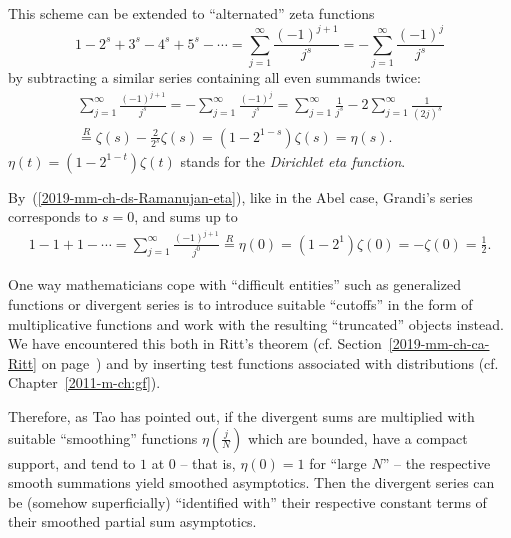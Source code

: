 This scheme can be extended\cite{Masina-Grandi} to ``alternated''
zeta functions
\begin{equation}
1-2^s+3^s-4^s+5^s - \cdots =\sum_{j=1}^\infty \frac{(-1)^{j+1}}{j^s}
=      - \sum_{j=1}^\infty \frac{(-1)^j}{j^s} %
\end{equation}
by subtracting a similar series containing all even summands
twice:
\begin{equation}
\begin{split}
\sum_{j=1}^\infty \frac{(-1)^{j+1}}{j^s}
=
-\sum_{j=1}^\infty \frac{(-1)^j}{j^s}
=
\sum_{j=1}^\infty \frac{ 1 }{j^s}
-
2 \sum_{j=1}^\infty \frac{ 1 }{ (2j)^s}
\\
\stackrel{R}{=}
\zeta (s) - \frac{2}{2^s}\zeta (s)
=
\left(1  -2^{1-s} \right)   \zeta (s)
=\eta (s).
\end{split}
\label{2019-mm-ch-ds-Ramanujan-eta}
\end{equation}
$\eta (t) = \left(1  -2^{1-t} \right)   \zeta (t)  $
stands for the {\em Dirichlet eta function}.

By~(\ref{2019-mm-ch-ds-Ramanujan-eta}),  like in the Abel case, Grandi's series
corresponds to $s=0$, and sums up to
\begin{equation}
\begin{split}
1-1+1- \cdots = \sum_{j=1}^\infty \frac{(-1)^{j+1}}{j^0}  \stackrel{R}{=} \eta (0)  =  \left(1  - 2^1\right)  \zeta (0)
= -\zeta (0) = \frac{1}{2}
.
\end{split}
\label{2019-mm-ch-ds-Ramanujan-eta-Grandi}
\end{equation}

One way mathematicians cope with ``difficult entities''
such as generalized functions or divergent series is
to introduce suitable ``cutoffs'' in the form of multiplicative functions
and work with the resulting ``truncated'' objects instead.
We have encountered this both in Ritt's theorem
(cf. Section~\ref{2019-mm-ch-ca-Ritt}
on page~\pageref{2019-mm-ch-ca-Ritt})
and by inserting test functions associated with distributions
(cf. Chapter~\ref{2011-m-ch:gf}).

Therefore,
as Tao has pointed out,
if the divergent sums are multiplied with suitable ``smoothing'' functions
$\eta \left(\frac{j}{N}\right)$  which are
bounded, have a compact support,
and tend to $1$ at $0$ -- that is, $\eta (0) = 1$ for ``large $N$'' --
the respective smooth summations yield  smoothed asymptotics.
Then the divergent series
can be (somehow superficially\cite{Candelpergher-2017}) ``identified with''  their respective constant terms of their smoothed partial
sum asymptotics.


